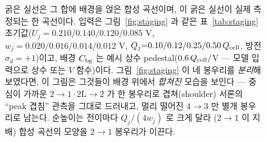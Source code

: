 \begin{figure}[t]
{굵은 실선은 그 합에 배경을 얹은 합성 곡선이며, 이 굵은 실선이 실제 측정되는 한 곡선이다. 입력은
그림~\ref{fig:staging} 과 같은 표~\ref{tab:staging} 초기값($U_j{=}0.210/0.140/0.120/0.085$ V,
$w_j{=}0.020/0.016/0.014/0.012$ V, $Q_j{=}0.10/0.12/0.25/0.50\,Q_{\mathrm{cell}}$, 방전 $\sigma_d{=}{+}1$)이고,
배경 $C_{\mathrm{bg}}$ 는 예시 상수 pedestal($0.6\,Q_{\mathrm{cell}}/$V --- 모델 입력으로 상수 또는 $V$ 함수)이다. 그림~\ref{fig:staging}
이 네 봉우리를 \emph{분리}해 보였다면, 이 그림은 그것들이 배경 위에서 \emph{합쳐진} 모습을 보인다 --- 중심이
가까운 $2\!\to\!1\cdot2\mathrm L\!\to\!2$ 가 한 봉우리로 겹쳐(shoulder) 서론의 ``peak 겹침'' 관측을 그대로
드러내고, 멀리 떨어진 $4\!\to\!3$ 만 별개 봉우리로 남는다. 순높이는 전이마다 $Q_j/(4w_j)$ 로 크게 달라
($2\!\to\!1$ 이 지배) 합성 곡선의 모양을 $2\!\to\!1$ 봉우리가 이끈다.}
\label{fig:cand-fo3-1}
\end{figure}
